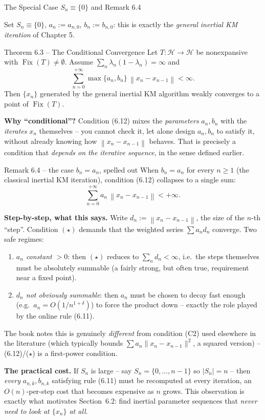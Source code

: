 \documentclass[aspectratio=169,10pt]{beamer}
\newcommand{\Hil}{\mathcal{H}}
\newcommand{\norm}[1]{\left\|#1\right\|}
\newcommand{\Fix}{\operatorname{Fix}}
\begin{document}
\begin{frame}[allowframebreaks]{The Special Case $S_n\equiv\{0\}$ and Remark 6.4}

Set $S_n\equiv\{0\}$, $a_n:=a_{n,0}$, $b_n:=b_{n,0}$: this is exactly the
\emph{general inertial KM iteration} of Chapter 5.

\begin{block}{Theorem 6.3 -- The Conditional Convergence}
Let $T:\Hil\to\Hil$ be nonexpansive with $\Fix(T)\ne\emptyset$. Assume
$\sum_n\lambda_n(1-\lambda_n)=\infty$ and
\[
\sum_{n=0}^{+\infty} \max\{a_n,b_n\}\,\norm{x_n-x_{n-1}} < \infty. \tag{6.12}
\]
Then $\{x_n\}$ generated by the general inertial KM algorithm weakly
converges to a point of $\Fix(T)$.
\end{block}

\textbf{Why ``conditional''?} Condition (6.12) mixes the \emph{parameters}
$a_n,b_n$ with the \emph{iterates} $x_n$ themselves -- you cannot check it,
let alone design $a_n,b_n$ to satisfy it, without already knowing how
$\norm{x_n-x_{n-1}}$ behaves. That is precisely a condition that
\emph{depends on the iterative sequence}, in the sense defined earlier.

\framebreak

\begin{block}{Remark 6.4 -- the case $b_n=a_n$, spelled out}
When $b_n=a_n$ for every $n\ge1$ (the classical inertial KM iteration),
condition (6.12) collapses to a single sum:
\[
\sum_{n=0}^{+\infty} a_n\,\norm{x_n-x_{n-1}} < +\infty. \tag{$\star$}
\]
\end{block}

\textbf{Step-by-step, what this says.} Write $d_n:=\norm{x_n-x_{n-1}}$, the
size of the $n$-th ``step''. Condition $(\star)$ demands that the weighted
series $\sum a_n d_n$ converge. Two safe regimes:
\begin{enumerate}
\item \emph{$a_n$ constant $>0$}: then $(\star)$ reduces to $\sum_n d_n<\infty$,
i.e.\ the steps themselves must be absolutely summable (a fairly strong,
but often true, requirement near a fixed point).
\item \emph{$d_n$ not obviously summable}: then $a_n$ must be chosen to
decay fast enough (e.g.\ $a_n=O(1/n^{1+\delta})$) to force the product
down -- exactly the role played by the online rule (6.11).
\end{enumerate}
The book notes this is genuinely \emph{different} from condition (C2) used
elsewhere in the literature (which typically bounds $\sum a_n\|x_n-x_{n-1}\|^2$,
a squared version) -- (6.12)/($\star$) is a first-power condition.

\framebreak

\textbf{The practical cost.} If $S_n$ is large -- say $S_n=\{0,\dots,n-1\}$
so $|S_n|=n$ -- then \emph{every} $a_{n,k},b_{n,k}$ satisfying rule (6.11)
must be recomputed at every iteration, an $O(n)$-per-step cost that becomes
expensive as $n$ grows. This observation is exactly what motivates
Section~6.2: find inertial parameter sequences that
\emph{never need to look at $\{x_n\}$ at all}.

\end{frame}
\end{document}

